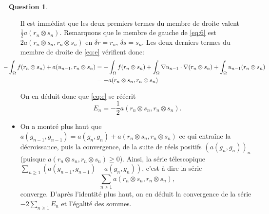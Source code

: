 \documentclass[11pt]{article}
\theoremstyle{definition}
\newtheorem{ques}{Question}
\begin{document}
\begin{ques}
\begin{itemize}
Il est immédiat que les deux premiers termes du membre de droite valent $\frac 12a(r_n\otimes s_n)$. 
Remarquons que le membre de gauche de \eqref{eq:6} est $2a(r_n\otimes s_n,r_n\otimes s_n)$ en $\delta r=r_n$, $\delta s=s_n$. Les deux derniers termes du membre de droite de \eqref{eq:e} vérifient donc:
\begin{align*}\hspace*{-1cm}
-\int_\Omega f(r_n\otimes s_n) + a(u_{n-1},r_n\otimes s_n) 
&= -\int_\Omega f(r_n\otimes s_n) + \int_\Omega \nabla u_{n-1}\cdot\nabla(r_n\otimes s_n) + \int_\Omega u_{n-1}(r_n\otimes s_n) \\
&= -a(r_n\otimes s_n,r_n\otimes s_n)
\end{align*}

On en déduit donc que \eqref{eq:e} se réécrit
\[
\boxed{E_n = -\frac 12a(r_n\otimes s_n,r_n \otimes s_n).}
\]

\item On a montré plus haut que $a(g_{n-1},g_{n-1}) = a(g_n,g_n) + a(r_n\otimes s_n,r_n\otimes s_n)$ ce qui entraîne la décroissance, puis la convergence, de la suite de réels positifs $\left(a(g_n,g_n)\right)_n$ (puisque $a(r_n\otimes s_n,r_n\otimes s_n)\geq 0$). Ainsi, la série télescopique $\sum_{n\geq 1} \left(a(g_{n-1},g_{n-1}) - a(g_n,g_n) \right)$, c'est-à-dire la série
\[
\sum_{n\geq 1} a(r_n\otimes s_n,r_n\otimes s_n),
\]
converge. D'après l'identité plus haut, on en déduit la convergence de la série $-2\sum_{n\geq 1}E_n$ et l'égalité des sommes.
\end{itemize}
\end{ques}
\end{document}
